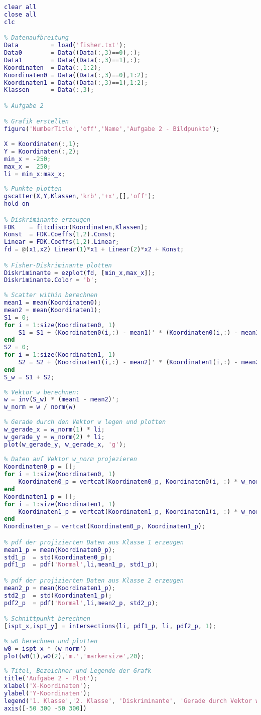 \documentclass[12pt]{article}
\begin{document}
\begin{lstlisting}[language=Matlab]
% Clean up
clear all
close all
clc

% Datenaufbreitung
Data         = load('fisher.txt');
Data0        = Data((Data(:,3)==0),:);
Data1        = Data((Data(:,3)==1),:);
Koordinaten  = Data(:,1:2);
Koordinaten0 = Data((Data(:,3)==0),1:2);
Koordinaten1 = Data((Data(:,3)==1),1:2);
Klassen      = Data(:,3);

% Aufgabe 2

% Grafik erstellen
figure('NumberTitle','off','Name','Aufgabe 2 - Bildpunkte');
    
X = Koordinaten(:,1);
Y = Koordinaten(:,2);
min_x = -250;
max_x =  250;
li = min_x:max_x;
    
% Punkte plotten
gscatter(X,Y,Klassen,'krb','+x',[],'off');
hold on

% Diskriminante erzeugen
FDK    = fitcdiscr(Koordinaten,Klassen);
Konst  = FDK.Coeffs(1,2).Const;
Linear = FDK.Coeffs(1,2).Linear;
fd = @(x1,x2) Linear(1)*x1 + Linear(2)*x2 + Konst;

% Fisher-Diskriminante plotten
Diskriminante = ezplot(fd, [min_x,max_x]);
Diskriminante.Color = 'b';
    
% Scatter within berechnen
mean1 = mean(Koordinaten0);
mean2 = mean(Koordinaten1);
S1 = 0;
for i = 1:size(Koordinaten0, 1)
    S1 = S1 + (Koordinaten0(i,:) - mean1)' * (Koordinaten0(i,:) - mean1);
end
S2 = 0;
for i = 1:size(Koordinaten1, 1)
	S2 = S2 + (Koordinaten1(i,:) - mean2)' * (Koordinaten1(i,:) - mean2);
end
S_w = S1 + S2;
  
% Vektor w berechnen:
w = inv(S_w) * (mean1 - mean2)';
w_norm = w / norm(w)
    
% Gerade durch den Vektor w legen und plotten
w_gerade_x = w_norm(1) * li;
w_gerade_y = w_norm(2) * li;
plot(w_gerade_y, w_gerade_x, 'g');    
    
% Daten auf Vektor w_norm projezieren
Koordinaten0_p = [];
for i = 1:size(Koordinaten0, 1)
    Koordinaten0_p = vertcat(Koordinaten0_p, Koordinaten0(i, :) * w_norm);
end
Koordinaten1_p = [];
for i = 1:size(Koordinaten1, 1)
    Koordinaten1_p = vertcat(Koordinaten1_p, Koordinaten1(i, :) * w_norm);
end
Koordinaten_p = vertcat(Koordinaten0_p, Koordinaten1_p);

% pdf der projizierten Daten aus Klasse 1 erzeugen
mean1_p = mean(Koordinaten0_p);
std1_p  = std(Koordinaten0_p);
pdf1_p  = pdf('Normal',li,mean1_p, std1_p);

% pdf der projizierten Daten aus Klasse 2 erzeugen
mean2_p = mean(Koordinaten1_p);
std2_p  = std(Koordinaten1_p);
pdf2_p  = pdf('Normal',li,mean2_p, std2_p);

% Schnittpunkt berechnen
[ispt_x,ispt_y] = intersections(li, pdf1_p, li, pdf2_p, 1);
    
% w0 berechnen und plotten
w0 = ispt_x * (w_norm')
plot(w0(1),w0(2),'m.','markersize',20);
    
% Titel, Bezeichner und Legende der Grafk
title('Aufgabe 2 - Plot');
xlabel('X-Koordinaten');
ylabel('Y-Koordinaten');
legend('1. Klasse','2. Klasse', 'Diskriminante', 'Gerade durch Vektor w', 'Punkt w_0')
axis([-50 300 -50 300])
\end{lstlisting}
\end{document}
